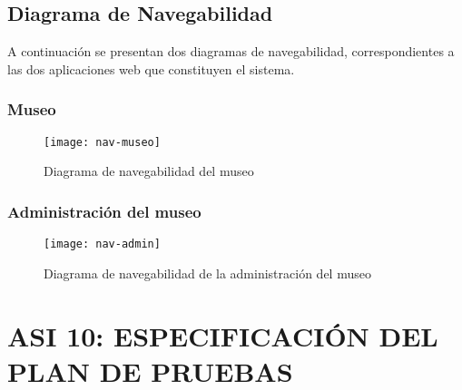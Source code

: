 
\subsection{Diagrama de Navegabilidad}
A continuación se presentan dos diagramas de navegabilidad, correspondientes a las dos aplicaciones web que constituyen el sistema.
\subsubsection{Museo}
\begin{figure}[H]
\centering
\texttt{[image: nav-museo]}
\caption{Diagrama de navegabilidad del museo}
\end{figure}

\subsubsection{Administración del museo}
\begin{figure}[H]
\centering
\texttt{[image: nav-admin]}
\caption{Diagrama de navegabilidad de la administración del museo}
\end{figure}

\newpage
\section{ASI 10: ESPECIFICACIÓN DEL PLAN DE PRUEBAS}
